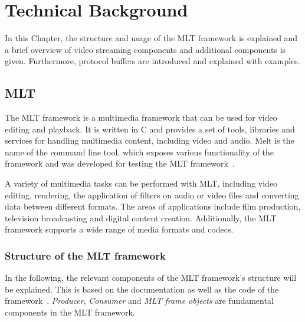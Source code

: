 \documentclass[../MasterThesis.tex]{subfiles}
\begin{document}
	
	

\newpage

\section{Technical Background} \label{section:technicalbackground}


In this Chapter, the structure and usage of the MLT framework is explained and a brief overview of video streaming components and additional components is given. Furthermore, protocol buffers are introduced and explained with examples.


\subsection{MLT} \label{subsection:melt}

The MLT framework is a multimedia framework that can be used for video editing and playback. It is written in C and provides a set of tools, libraries and services for handling multimedia content, including video and audio. Melt is the name of the command line tool, which exposes various functionality of the framework and was developed for testing the MLT framework~\cite{melt}. 




A variety of multimedia tasks can be performed with MLT, including video editing, rendering, the application of filters on audio or video files and converting data between different formats.
The areas of applications include film production, television broadcasting and digital content creation. 
Additionally, the MLT framework supports a wide range of media formats and codecs.




\subsubsection*{Structure of the MLT framework}


In the following, the relevant components of the MLT framework's structure will be explained. This is based on the documentation as well as the code of the framework~\cite{melt, melt_code}.
%
\textit{Producer}, \textit{Consumer} and \textit{MLT frame objects} are fundamental components in the MLT framework.
\end{document}
